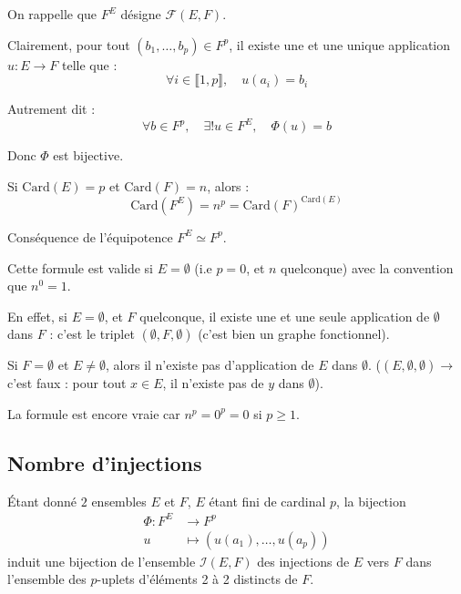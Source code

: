 \documentclass[a4paper,11pt]{article}
\begin{document}
\begin{demonstration}
  On rappelle que $F^E$ désigne $\mathcal{F}(E, F)$.
  
  Clairement, pour tout $(b_1, \dots, b_p) \in F^p$, il existe une et une unique application $u : E \to F$ telle que :
  $$ \forall i \in \llbracket 1, p \rrbracket, \quad u(a_i) = b_i $$
  
  Autrement dit :
  $$ \forall b \in F^p, \quad \exists! u \in F^E, \quad \Phi(u) = b $$
  
  Donc $\Phi$ est bijective.
\end{demonstration}

\begin{corollaire}
  Si $\text{Card}(E) = p$ et $\text{Card}(F) = n$, alors :
  $$ \text{Card}(F^E) = n^p = \text{Card}(F)^{\text{Card}(E)} $$
\end{corollaire}

\begin{demonstration}
  Conséquence de l'équipotence $F^E \simeq F^p$.
\end{demonstration}

\begin{remarque}
  Cette formule est valide si $E = \emptyset$ (i.e $p=0$, et $n$ quelconque) avec la convention que $n^0 = 1$.
  
  En effet, si $E = \emptyset$, et $F$ quelconque, il existe une et une seule application de $\emptyset$ dans $F$ : c'est le triplet $(\emptyset, F, \emptyset)$ (c'est bien un graphe fonctionnel).
  
  Si $F = \emptyset$ et $E \neq \emptyset$, alors il n'existe pas d'application de $E$ dans $\emptyset$.
  ($(E, \emptyset, \emptyset) \to$ c'est faux : pour tout $x \in E$, il n'existe pas de $y$ dans $\emptyset$).
  
  La formule est encore vraie car $n^p = 0^p = 0$ si $p \ge 1$.
\end{remarque}


\newpage
\subsection*{Nombre d'injections}

Étant donné $2$ ensembles $E$ et $F$, $E$ étant fini de cardinal $p$, la bijection 
\begin{align*}
  \Phi : F^E &\longrightarrow F^p \\
  u &\longmapsto (u(a_1), \dots, u(a_p))
\end{align*}
induit une bijection de l'ensemble $\mathcal{I}(E, F)$ des injections de $E$ vers $F$ dans l'ensemble des $p$-uplets d'éléments 2 à 2 distincts de $F$.
\end{document}
